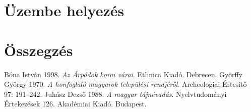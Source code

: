 \documentclass[
]{thesis-ekf}
\begin{document}
\chapter{Üzembe helyezés}
\cite[]{Gyorffy,Juhasz}

\chapter*{Összegzés}

\begin{thebibliography}{}
Bóna István 1998. \emph{Az Árpádok korai várai}. Ethnica Kiadó. Debrecen.
Györffy György 1970. \emph{A honfoglaló magyarok települési rendjéről}. Archeologiai Értesítő 97: 191--242.
Juhász Dezső 1988. \emph{A magyar tájnévadás}. Nyelvtudományi Értekezések 126. Akadémiai Kiadó. Budapest.
\end{thebibliography}


\end{document}
